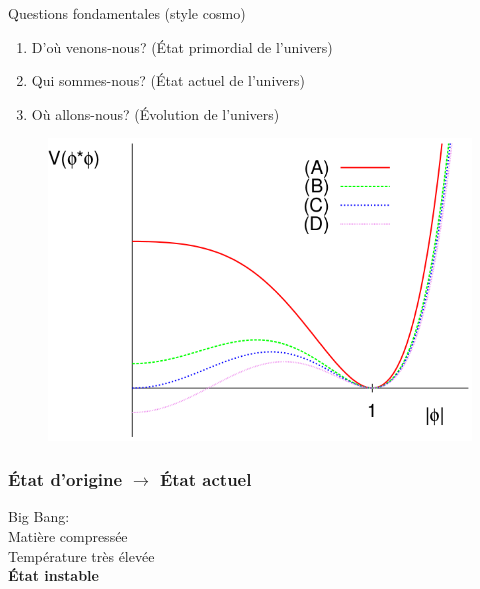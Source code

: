 \documentclass[handout]{beamer}
\begin{document}
\begin{frame}
\begin{block}{Questions fondamentales (style cosmo)}
\begin{enumerate}
\item D'où venons-nous? (État primordial de l'univers)
\item Qui sommes-nous? (État actuel de l'univers)
\item Où allons-nous? (Évolution de l'univers)
\end{enumerate}
\end{block}
\begin{figure}[0.5\textwidth]
  \includegraphics[scale=0.25]{evo_pot.png}
 \end{figure}
\end{frame}

\begin{frame}\frametitle{État d'origine $\rightarrow$ État actuel}
Big Bang:\\ Matière compressée\\ Température très élevée\\ \textbf{État instable}


\end{frame}


\end{document}
